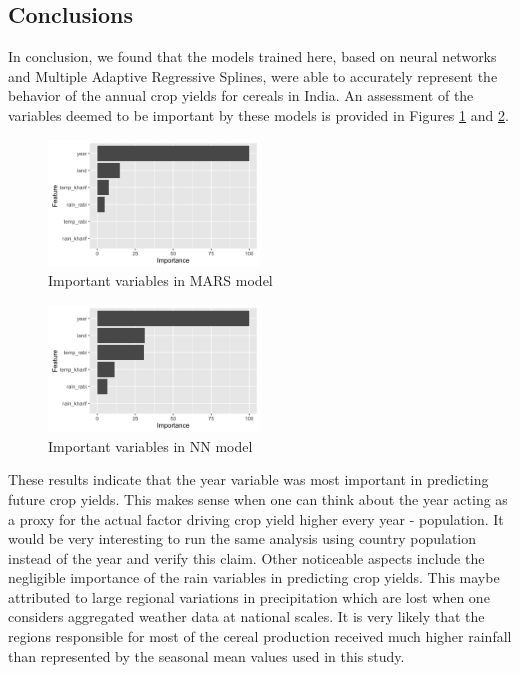 \documentclass[conference]{IEEEtran}
\begin{document}
\subsection{Conclusions}
In conclusion, we found that the models trained here, based on neural networks and Multiple Adaptive Regressive Splines, were able to accurately represent the behavior of the annual crop yields for cereals in India. An assessment of the variables deemed to be important by these models is provided in Figures \ref{res:mars_imp} and \ref{res:avgnn_imp}.
\begin{figure}[!h]
    \centering
    \includegraphics[width=0.5\textwidth]{mars_varimp.png}
    \caption{Important variables in MARS model}
    \label{res:mars_imp}
\end{figure}
\begin{figure}[!h]
    \centering
    \includegraphics[width=0.5\textwidth]{avgnn_varimp.png}
    \caption{Important variables in NN model}
    \label{res:avgnn_imp}
\end{figure}

These results indicate that the year variable was most important in predicting future crop yields. This makes sense when one can think about the year acting as a proxy for the actual factor driving crop yield higher every year - population. It would be very interesting to run the same analysis using country population instead of the year and verify this claim. Other noticeable aspects include the negligible importance of the rain variables in predicting crop yields. This maybe attributed to large regional variations in precipitation which are lost when one considers aggregated weather data at national scales. It is very likely that the regions responsible for most of the cereal production received much higher rainfall than represented by the seasonal mean values used in this study. 
\end{document}
